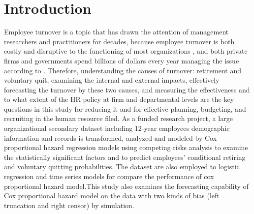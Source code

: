 \documentclass[12pt,letterpaper]{article}
\title{}
\author{Xiaojuan Zhu}
\begin{document}
\maketitle

\begin{abstract}


\end{abstract}

\section{Introduction}
Employee turnover is a topic that has drawn the attention of management researchers and practitioners for decades, because  employee turnover is both costly and disruptive to the functioning of most organizations \citep{staw1980, mueller1989,kacmar2006}, and both private firms and governments spend billions of dollars every year managing the issue according to \citet{leonard2001}. Therefore, understanding the causes of turnover: retirement and voluntary quit, examining the internal and external impacts, effectively forecasting the turnover by these two causes, and measuring the effectiveness and to what extent of the HR policy at firm and departmental levels are the key questions in this study for reducing it and for effective planning, budgeting, and recruiting in the human resource filed. As a funded research project, a large organizational secondary dataset including 12-year employees demographic information and records is transformed, analyzed and modeled by Cox proportional hazard regression models using competing risks analysis to examine the statistically significant factors and to predict employees' conditional retiring and voluntary quitting probabilities. The dataset are also employed to logistic regression and time series models for compare the performance of cox proportional hazard model.This study also examines the forecasting capability of Cox proportional hazard model on the data with two kinds of bias (left truncation and right censor) by simulation.      
\end{document}
